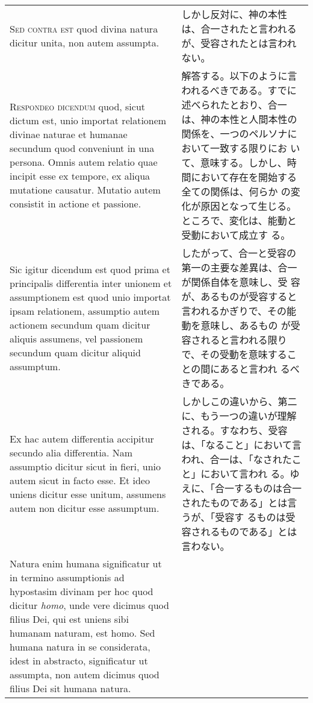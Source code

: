\documentclass[10pt]{jsarticle} %
\begin{document}
\begin{longtable}{p{21em}p{21em}}
{\scshape Sed contra est} quod divina natura dicitur unita, non autem
assumpta.


&

しかし反対に、神の本性は、合一されたと言われるが、受容されたとは言われ
ない。

\\



{\scshape Respondeo dicendum} quod, sicut dictum est, unio importat
relationem divinae naturae et humanae secundum quod conveniunt in una
persona. Omnis autem relatio quae incipit esse ex tempore, ex aliqua
mutatione causatur. Mutatio autem consistit in actione et passione.


&

解答する。以下のように言われるべきである。すでに述べられたとおり、合一
は、神の本性と人間本性の関係を、一つのペルソナにおいて一致する限りにお
いて、意味する。しかし、時間において存在を開始する全ての関係は、何らか
の変化が原因となって生じる。ところで、変化は、能動と受動において成立す
る。


\\

Sic igitur dicendum est quod prima et principalis differentia inter
unionem et assumptionem est quod unio importat ipsam relationem,
assumptio autem actionem secundum quam dicitur aliquis assumens, vel
passionem secundum quam dicitur aliquid assumptum.


&

したがって、合一と受容の第一の主要な差異は、合一が関係自体を意味し、受
容が、あるものが受容すると言われるかぎりで、その能動を意味し、あるもの
が受容されると言われる限りで、その受動を意味することの間にあると言われ
るべきである。


\\

Ex hac autem differentia accipitur secundo alia differentia. Nam
assumptio dicitur sicut in fieri, unio autem sicut in facto esse. Et
ideo uniens dicitur esse unitum, assumens autem non dicitur esse
assumptum.


&

しかしこの違いから、第二に、もう一つの違いが理解される。すなわち、受容
は、「なること」において言われ、合一は、「なされたこと」において言われ
る。ゆえに、「合一するものは合一されたものである」とは言うが、「受容す
るものは受容されるものである」とは言わない。


\\

Natura enim humana significatur ut in termino assumptionis ad
hypostasim divinam per hoc quod dicitur {\itshape homo}, unde vere
dicimus quod filius Dei, qui est uniens sibi humanam naturam, est
homo. Sed humana natura in se considerata, idest in abstracto,
significatur ut assumpta, non autem dicimus quod filius Dei sit humana
natura.



\end{longtable}
\end{document}
